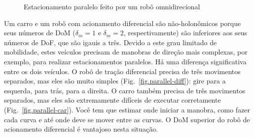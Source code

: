 \begin{figure}
\begin{center}
\end{center}
\caption{Estacionamento paralelo feito por um robô omnidirecional}\label{fig.parallel-omni}
\end{figure}

Um carro e um robô com acionamento diferencial são não-holonômicos porque seus números de DoM ($\delta_m=1$ e $\delta_m=2$, respectivamente) são inferiores aos seus números de DoF, que são igauis a três. Devido a este grau limitado de mobilidade, estes veículos precisam de manobras de direção mais complexas, por exemplo, para realizar estacionamentos paralelos. Há uma diferença significativa entre os dois veículos. O robô de tração diferencial precisa de três movimentos separados, mas eles são muito simples (Fig.~\ref{fig.parallel-diff}): gire para a esquerda, para trás, para a direita. O carro também precisa de três movimentos separados, mas eles são extremamente difíceis de executar corretamente (Fig.~\ref{fig.parallel-car}). Você tem que estimar onde iniciar a manobra, como fazer cada curva e até onde deve se mover entre as curvas. O DoM superior do robô de acionamento diferencial é vantajoso nesta situação.

